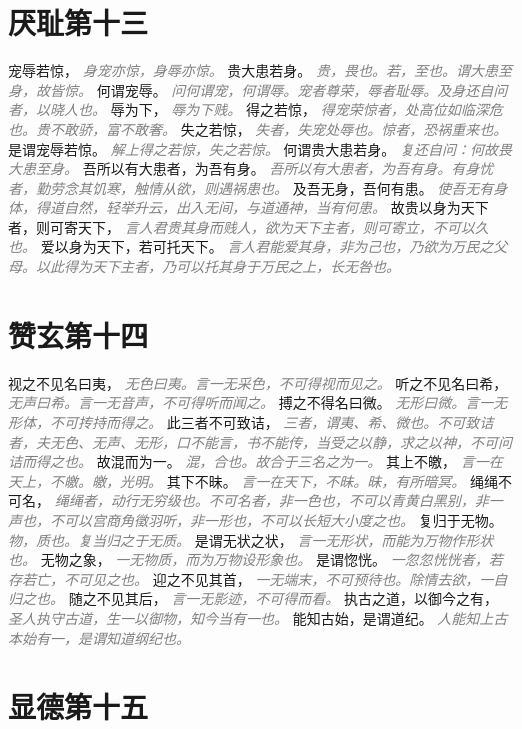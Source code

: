\documentclass[a4paper,zihao=-4,oneside,landscape,UTF8]{ctexart}
\newcommand{\zhushi}[1]{\scriptsize{\textit{\textcolor{gray}{#1}}}\normalsize}
\begin{document}
\section{厌耻第十三}

宠辱若惊，
\zhushi{身宠亦惊，身辱亦惊。}
贵大患若身。
\zhushi{贵，畏也。若，至也。谓大患至身，故皆惊。}
何谓宠辱。
\zhushi{问何谓宠，何谓辱。宠者尊荣，辱者耻辱。及身还自问者，以晓人也。}
辱为下，
\zhushi{辱为下贱。}
得之若惊，
\zhushi{得宠荣惊者，处高位如临深危也。贵不敢骄，富不敢奢。}
失之若惊，
\zhushi{失者，失宠处辱也。惊者，恐祸重来也。}
是谓宠辱若惊。
\zhushi{解上得之若惊，失之若惊。}
何谓贵大患若身。
\zhushi{复还自问：何故畏大患至身。}
吾所以有大患者，为吾有身。
\zhushi{吾所以有大患者，为吾有身。有身忧者，勤劳念其饥寒，触情从欲，则遇祸患也。}
及吾无身，吾何有患。
\zhushi{使吾无有身体，得道自然，轻举升云，出入无间，与道通神，当有何患。}
故贵以身为天下者，则可寄天下，
\zhushi{言人君贵其身而贱人，欲为天下主者，则可寄立，不可以久也。}
爱以身为天下，若可托天下。
\zhushi{言人君能爱其身，非为己也，乃欲为万民之父母。以此得为天下主者，乃可以托其身于万民之上，长无咎也。}


\section{赞玄第十四}


视之不见名曰夷，
\zhushi{无色曰夷。言一无采色，不可得视而见之。}
听之不见名曰希，
\zhushi{无声曰希。言一无音声，不可得听而闻之。}
搏之不得名曰微。
\zhushi{无形曰微。言一无形体，不可抟持而得之。}
此三者不可致诘，
\zhushi{三者，谓夷、希、微也。不可致诘者，夫无色、无声、无形，口不能言，书不能传，当受之以静，求之以神，不可问诘而得之也。}
故混而为一。
\zhushi{混，合也。故合于三名之为一。}
其上不皦，
\zhushi{言一在天上，不皦。皦，光明。}
其下不昧。
\zhushi{言一在天下，不昧。昧，有所暗冥。}
绳绳不可名，
\zhushi{绳绳者，动行无穷级也。不可名者，非一色也，不可以青黄白黑别，非一声也，不可以宫商角徵羽听，非一形也，不可以长短大小度之也。}
复归于无物。
\zhushi{物，质也。复当归之于无质。}
是谓无状之状，
\zhushi{言一无形状，而能为万物作形状也。}
无物之象，
\zhushi{一无物质，而为万物设形象也。}
是谓惚恍。
\zhushi{一忽忽恍恍者，若存若亡，不可见之也。}
迎之不见其首，
\zhushi{一无端末，不可预待也。除情去欲，一自归之也。}
随之不见其后，
\zhushi{言一无影迹，不可得而看。}
执古之道，以御今之有，
\zhushi{圣人执守古道，生一以御物，知今当有一也。}
能知古始，是谓道纪。
\zhushi{人能知上古本始有一，是谓知道纲纪也。}


\section{显德第十五}
\end{document}
